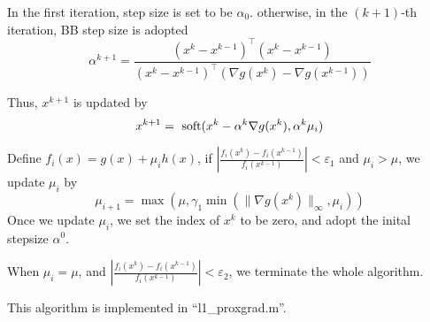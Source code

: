 \documentclass[conference,onecolumn,12pt]{IEEEtran}
\newcommand{\<}{\langle}
\renewcommand{\>}{\rangle}
\numberwithin{equation}{section}
\begin{document}
In the first iteration, step size is set to be $\alpha_0$. otherwise, in the $(k+1)$-th iteration, BB step size is adopted
\begin{equation}
    \label{proxbb}
    \alpha^{k+1}=\frac{(x^k-x^{k-1})^\top (x^k-x^{k-1})}{(x^k-x^{k-1})^\top(\nabla g(x^k)-\nabla g(x^{k-1}))}
\end{equation}

Thus, $x^{k+1}$ is updated by
\begin{equation}
    \label{proxxup}
    x^{k+1}={\ \rm soft}(x^k-\alpha^k \nabla g(x^k),\alpha^k \mu_i)
\end{equation}

Define $f_i(x)=g(x)+\mu_i h(x)$, if $|\frac{f_i(x^k)-f_i(x^{k-1})}{f_i(x^{k-1})}|<\varepsilon_1$ and $\mu_i>\mu$, we update $\mu_i$ by
\begin{equation}
    \label{proxmuup}
    \mu_{i+1}=\max(\mu,\gamma_1\min(\|\nabla g(x^k)\|_\infty,\mu_i))
\end{equation}
Once we update $\mu_i$, we set the index of $x^k$ to be zero, and adopt the inital stepsize $\alpha^0$. 

When $\mu_i=\mu$, and $|\frac{f_i(x^k)-f_i(x^{k-1})}{f_i(x^{k-1})}|<\varepsilon_2$, we terminate the whole algorithm.

This algorithm is implemented in ``l1\_proxgrad.m''.


\end{document}
